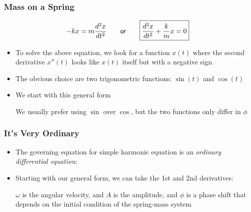 \documentclass[12pt,compress,aspectratio=169]{beamer}
\begin{document}
\begin{frame}
  \frametitle{Mass on a Spring}

  {\Large
    \begin{displaymath}
      -kx=m\frac{d^2x}{dt^2}\quad\quad\textsf{\normalsize or}\quad\quad
      \boxed{\frac{d^2x}{dt^2}+\frac{k}{m}x=0}
    \end{displaymath}
  }
  \begin{itemize}
  \item To solve the above equation, we look for a function $x(t)$ where the
    second derivative $x''(t)$ looks like $x(t)$ itself but with a negative sign
  \item The obvious choice are two trigonometric functions: $\sin(t)$ and
    $\cos(t)$
  \item<2-> We start with this general form
    
    \vspace{-0.3in}{\Large
      \begin{displaymath}
        x(t)=A\sin(\omega t+\phi)
      \end{displaymath}
    }

    \vspace{-0.2in}We usually prefer using $\sin$ over $\cos$, but the
    two functions only differ in $\phi$
  \end{itemize}
\end{frame}


\begin{frame}
  \frametitle{It's Very Ordinary}
  \begin{itemize}
  \item The governing equation for simple harmonic equation is an
    \emph{ordinary differential equation}:

  \item Starting with our general form, we can take the 1st and 2nd derivatives:
 
    \vspace{-0.35in}{\Large
      \begin{align*}
        x(t)&=A\sin(\omega t+\phi)\\
        x'(t)&=A\omega\cos(\omega t+\phi)\\
        x''(t)&=-A\omega^2\sin(\omega t+\phi)=-\omega^2x
      \end{align*}
    }
    
    \vspace{-0.2in}$\omega$ is the angular velocity, and $A$ is the amplitude,
    and $\phi$ is a phase shift that depends on the initial condition of the
    spring-mass system
  \end{itemize}
\end{frame}
\end{document}
